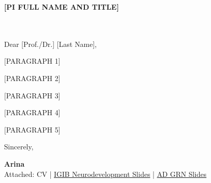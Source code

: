 \documentclass[11pt,a4paper]{letter}
\date{\today}
\begin{document}
\begin{letter}{
  \textbf{[PI FULL NAME AND TITLE]}\\
  [Role]\\
  [Institution]\\
  [City, Country]
}

\opening{Dear [Prof./Dr.] [Last Name],}

[PARAGRAPH 1]

[PARAGRAPH 2]

[PARAGRAPH 3]

[PARAGRAPH 4]

[PARAGRAPH 5]

\closing{Sincerely,}

\vspace{-6pt}
\textbf{\color{accent}Arina}\\[4pt]
\small
Attached: CV \quad|\quad
\href{[IGIB slides link]}{IGIB Neurodevelopment Slides} \quad|\quad
\href{[Chalmers slides link]}{AD GRN Slides}

\end{letter}
\end{document}
